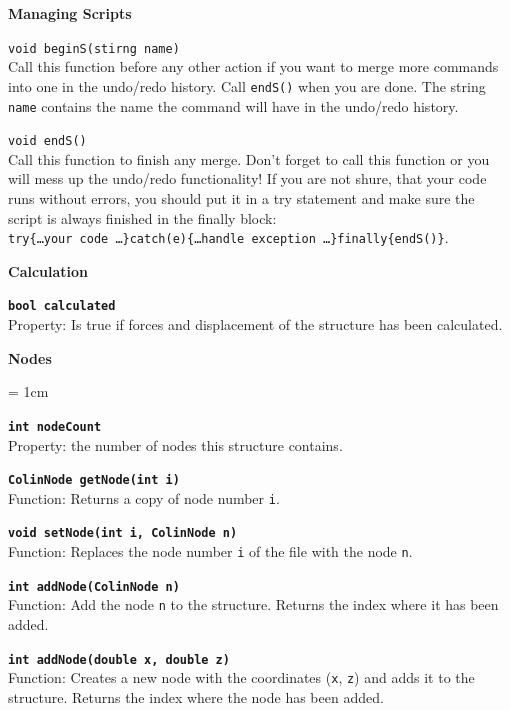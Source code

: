 \begin{trivlist}
	\item[]\textbf{Managing Scripts}
	\begin{trivlist}
		\leftskip=1cm
		\item[] \texttt{void beginS(stirng name)}\\ Call this function before any other action if you want to merge more commands into one in the undo/redo history. Call \texttt{endS()} when you are done. The string \texttt{name} contains the name the command will have in the undo/redo history.
		\item[] \texttt{void endS()} \\Call this function to finish any merge. Don't forget to call this function or you will mess up the undo/redo functionality! If you are not shure, that your code runs without errors, you should put it in a try statement and make sure the script is always finished in the finally block: \\
		\texttt{try\{\dots your code \dots\}catch(e)\{\dots handle exception \dots\}finally\{endS()\}}.
	\end{trivlist}
	\item[]\textbf{Calculation}
	\begin{trivlist}
		\leftskip=1cm
		\item[]\textbf{\texttt{bool calculated}}\\ Property: Is true if forces and displacement of the structure has been calculated.
	\end{trivlist}
	\item[]\textbf{Nodes}
	\begin{trivlist}
		\leftskip = 1cm
		\item[] \textbf{\texttt{int nodeCount}}\\ Property: the number of nodes this structure contains. 
		\item[] \textbf{\texttt{ColinNode getNode(int i)}}\\ Function: Returns a copy of node number \texttt{i}.
		\item[] \textbf{\texttt{void setNode(int i, ColinNode n)}}\\ Function: Replaces the node number \texttt{i} of the file with the node \texttt{n}.
		\item[] \textbf{\texttt{int addNode(ColinNode n)}}\\ Function: Add the node \texttt{n} to the structure. Returns the index where it has been added.
		\item[] \textbf{\texttt{int addNode(double x, double z)}}\\ Function: Creates a new node with the coordinates (\texttt{x}, \texttt{z}) and adds it to the structure. Returns the index where the node has been added.

\end{trivlist}
\end{trivlist}
